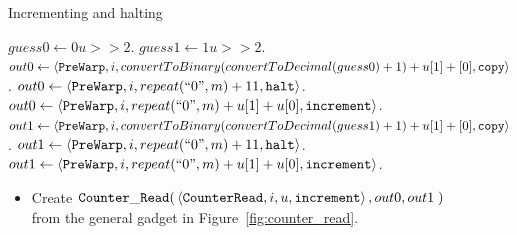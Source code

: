 \begin{itemize}
    \begin{algorithm}
        \caption{Incrementing and halting\label{asda}}
        \begin{algorithmic}[1]
                \State $guess0 \gets 0u >> 2$.
                \State $guess1 \gets 1u >> 2$.
                    \State $out0 \gets \left\langle {\tt PreWarp}, i, convertToBinary(convertToDecimal(guess0) + 1) + u[1] + [0], {\tt copy} \right\rangle$.
                \Else
                        \State $out0 \gets \left\langle {\tt PreWarp}, i, repeat(``0", m) + 11, {\tt halt} \right\rangle$.
                    \Else
                        \State $out0 \gets \left\langle {\tt PreWarp}, i, repeat(``0", m) + u[1] + u[0], {\tt increment} \right\rangle$.
                    \EndIf
                \EndIf
                    \State $out1 \gets \left\langle {\tt PreWarp}, i, convertToBinary(convertToDecimal(guess1) + 1) + u[1] + [0], {\tt copy} \right\rangle$.
                \Else
                        \State $out1 \gets \left\langle {\tt PreWarp}, i, repeat(``0", m) + 11, {\tt halt} \right\rangle$.
                    \Else
                        \State $out1 \gets \left\langle {\tt PreWarp}, i, repeat(``0", m) + u[1] + u[0], {\tt increment} \right\rangle$.
                    \EndIf
                \EndIf
            \EndFunction
        \end{algorithmic}
    \end{algorithm}

    \begin{itemize}
        \item
        Create $\begin{aligned}[t]
                   {\tt Counter\_Read}(& \left\langle {\tt CounterRead}, i, u, {\tt increment} \right\rangle, out0, out1 \;)
               \end{aligned}$\\from the general gadget in Figure~\ref{fig:counter_read}.
    \end{itemize}
\end{itemize}

